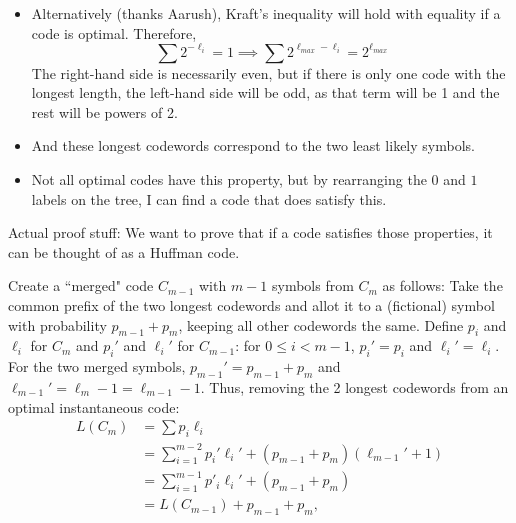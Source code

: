 \documentclass[12pt]{article}
\begin{document}
\begin{itemize}
\begin{itemize}
        \item Alternatively (thanks Aarush), Kraft's inequality will hold with equality if a code is optimal. Therefore,
        \[\sum 2^{-\ell_i} = 1 \implies \sum 2^{\ell_{max}-\ell_i} = 2^{\ell_{max}}\]
        The right-hand side is necessarily even, but if there is only one code with the longest length, the left-hand side will be odd, as that term will be 1 and the rest will be powers of 2.
    \item[3.] And these longest codewords correspond to the two least likely symbols.
    \end{itemize}
    \begin{itemize}
        \item Not all optimal codes have this property, but by rearranging the $0$ and $1$ labels on the tree, I can find a code that does satisfy this.
    \end{itemize}
\end{itemize}



Actual proof stuff: We want to prove that if a code satisfies those properties, it can be thought of as a Huffman code.

Create a ``merged" code $C_{m-1}$ with $m-1$ symbols from $C_m$ as follows: Take the common prefix of the two longest codewords and allot it to a (fictional) symbol with probability $p_{m-1} + p_m$, keeping all other codewords the same. Define $p_i$ and $\ell_i$ for $C_m$ and $p_i'$ and $\ell_i'$ for $C_{m-1}$: for $0\le i < m-1$, $p_i' = p_i$ and $\ell_i' = \ell_i$. For the two merged symbols, $p_{m-1}' = p_{m-1} + p_{m}$ and $\ell_{m-1}' = \ell_m - 1 = \ell_{m-1} - 1$. Thus, removing the 2 longest codewords from an optimal instantaneous code:
\begin{align*}
    L(C_m) &= \sum p_i \ell_i \\
    &= \sum_{i=1}^{m-2} p_i' \ell_i' + (p_{m-1} + p_m) (\ell_{m-1}' + 1) \\
    &= \sum_{i=1}^{m-1} p'_i \ell_i' + (p_{m-1} + p_m) \\
    &= L(C_{m-1}) + p_{m-1} + p_m,
\end{align*}
\end{document}
